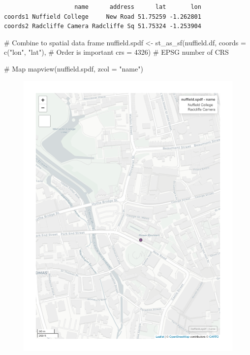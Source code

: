\documentclass[
  letterpaper,
]{scrbook}
\newenvironment{Shaded}{\begin{snugshade}}{\end{snugshade}}
\newcommand{\AttributeTok}[1]{\textcolor[rgb]{0.40,0.45,0.13}{#1}}
\newcommand{\CommentTok}[1]{\textcolor[rgb]{0.37,0.37,0.37}{#1}}
\newcommand{\DecValTok}[1]{\textcolor[rgb]{0.68,0.00,0.00}{#1}}
\newcommand{\FunctionTok}[1]{\textcolor[rgb]{0.28,0.35,0.67}{#1}}
\newcommand{\NormalTok}[1]{\textcolor[rgb]{0.00,0.23,0.31}{#1}}
\newcommand{\OtherTok}[1]{\textcolor[rgb]{0.00,0.23,0.31}{#1}}
\newcommand{\StringTok}[1]{\textcolor[rgb]{0.13,0.47,0.30}{#1}}
\begin{document}
\begin{verbatim}
                    name      address      lat       lon
coords1 Nuffield College     New Road 51.75259 -1.262801
coords2 Radcliffe Camera Radcliffe Sq 51.75324 -1.253904
\end{verbatim}

\begin{Shaded}
\begin{Highlighting}[]
\CommentTok{\# Combine to spatial data frame}
\NormalTok{nuffield.spdf }\OtherTok{\textless{}{-}} \FunctionTok{st\_as\_sf}\NormalTok{(nuffield.df, }
                          \AttributeTok{coords =} \FunctionTok{c}\NormalTok{(}\StringTok{"lon"}\NormalTok{, }\StringTok{"lat"}\NormalTok{), }\CommentTok{\# Order is important}
                          \AttributeTok{crs =} \DecValTok{4326}\NormalTok{) }\CommentTok{\# EPSG number of CRS}

\CommentTok{\# Map}
\FunctionTok{mapview}\NormalTok{(nuffield.spdf, }\AttributeTok{zcol =} \StringTok{"name"}\NormalTok{)}
\end{Highlighting}
\end{Shaded}

\begin{figure}[H]

{\centering \includegraphics{01_refresher_files/figure-pdf/unnamed-chunk-4-1.pdf}

}

\end{figure}
\end{document}
